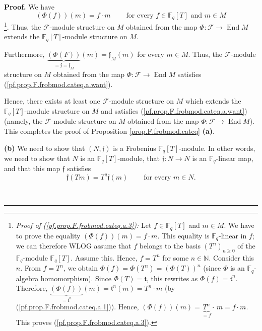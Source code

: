 \documentclass[numbers=enddot,12pt,final,onecolumn,notitlepage]{scrartcl}%
\theoremstyle{definition}
\newenvironment{proof}[1][Proof]{\noindent\textbf{#1.} }{\ \rule{0.5em}{0.5em}}
\begin{document}
\begin{proof}
We have
\begin{equation}
\left(  \Phi\left(  f\right)  \right)  \left(  m\right)  =f\cdot
m\ \ \ \ \ \ \ \ \ \ \text{for every }f\in\mathbb{F}_{q}\left[  T\right]
\text{ and }m\in M \label{pf.prop.F.frobmod.cateq.a.3}%
\end{equation}
\footnote{\textit{Proof of (\ref{pf.prop.F.frobmod.cateq.a.3}):} Let
$f\in\mathbb{F}_{q}\left[  T\right]  $ and $m\in M$. We have to prove the
equality $\left(  \Phi\left(  f\right)  \right)  \left(  m\right)  =f\cdot m$.
This equality is $\mathbb{F}_{q}$-linear in $f$; we can therefore WLOG assume
that $f$ belongs to the basis $\left(  T^{n}\right)  _{n\geq0}$ of the
$\mathbb{F}_{q}$-module $\mathbb{F}_{q}\left[  T\right]  $. Assume this.
Hence, $f=T^{n}$ for some $n\in\mathbb{N}$. Consider this $n$. From $f=T^{n}$,
we obtain $\Phi\left(  f\right)  =\Phi\left(  T^{n}\right)  =\left(
\Phi\left(  T\right)  \right)  ^{n}$ (since $\Phi$ is an $\mathbb{F}_{q}%
$-algebra homomorphism). Since $\Phi\left(  T\right)  =\mathfrak{t}$, this
rewrites as $\Phi\left(  f\right)  =\mathfrak{t}^{n}$. Therefore,
$\underbrace{\left(  \Phi\left(  f\right)  \right)  }_{=\mathfrak{t}^{n}%
}\left(  m\right)  =\mathfrak{t}^{n}\left(  m\right)  =T^{n}\cdot m$ (by
(\ref{pf.prop.F.frobmod.cateq.a.1})). Hence, $\left(  \Phi\left(  f\right)
\right)  \left(  m\right)  =\underbrace{T^{n}}_{=f}\cdot\,m=f\cdot m$. This
proves (\ref{pf.prop.F.frobmod.cateq.a.3}).}. Thus, the $\mathcal{F}$-module
structure on $M$ obtained from the map $\Phi:\mathcal{F}\rightarrow
\operatorname*{End}M$ extends the $\mathbb{F}_{q}\left[  T\right]  $-module
structure on $M$.

Furthermore, $\underbrace{\left(  \Phi\left(  F\right)  \right)
}_{=\mathfrak{f}=\mathfrak{f}_{M}}\left(  m\right)  =\mathfrak{f}_{M}\left(
m\right)  $ for every $m\in M$. Thus, the $\mathcal{F}$-module structure on
$M$ obtained from the map $\Phi:\mathcal{F}\rightarrow\operatorname*{End}M$
satisfies (\ref{pf.prop.F.frobmod.cateq.a.want}).

Hence, there exists at least one $\mathcal{F}$-module structure on $M$ which
extends the $\mathbb{F}_{q}\left[  T\right]  $-module structure on $M$ and
satisfies (\ref{pf.prop.F.frobmod.cateq.a.want}) (namely, the $\mathcal{F}%
$-module structure on $M$ obtained from the map $\Phi:\mathcal{F}%
\rightarrow\operatorname*{End}M$). This completes the proof of Proposition
\ref{prop.F.frobmod.cateq} \textbf{(a)}. \medskip

\textbf{(b)} We need to show that $\left(  N,\mathfrak{f}\right)  $ is a
Frobenius $\mathbb{F}_{q}\left[  T\right]  $-module. In other words, we need
to show that $N$ is an $\mathbb{F}_{q}\left[  T\right]  $-module, that
$\mathfrak{f}:N\rightarrow N$ is an $\mathbb{F}_{q}$-linear map, and that this
map $\mathfrak{f}$ satisfies%
\begin{equation}
\mathfrak{f}\left(  Tm\right)  =T^{q}\mathfrak{f}\left(  m\right)
\ \ \ \ \ \ \ \ \ \ \text{for every }m\in N.
\label{pf.prop.F.frobmod.cateq.b.want}%
\end{equation}



\end{proof}
\end{document}
